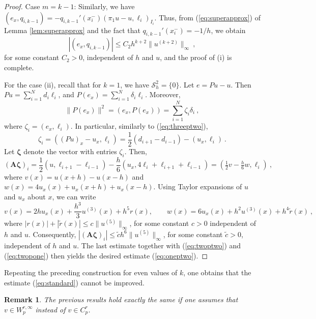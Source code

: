 \documentclass{amsart}
\newcommand{\bA}{\mathbf{A}}
\newcommand{\bB}{\mathbf{B}}
\newcommand{\bzeta}{\boldsymbol{\zeta}}
\newtheorem{remark}{Remark}[section]
\begin{document}
\begin{proof}
Case $m=k-1$: Similarly, we have 
$(e_x,q_{i,k-1})=-q_{i,k-1}'(x_i^-)(\pi_1 u-u,\ell_i)_{I_i}$.
Thus, from (\ref{eq:superapprox}) of Lemma \ref{lem:superapprox} and the fact that $q_{i,k-1}'(x_{i}^-)=-1/h$, we obtain
$$|(e_x,q_{i,k-1})|\leq C_2 h^{k+2}\|u^{(k+2)}\|_\infty\ ,$$
for some constant $C_2>0$, independent of $h$ and $u$, and the proof of (i) is complete.
%

For the case (ii), recall that for $k=1$, we have $\mathcal{S}_h^2=\{0\}$. Let $e=Pu-u$. Then $Pu=\sum_{i=1}^N d_i\ell_i$, and $P(e_x)=\sum_{i=1}^N\delta_i\ell_i$. Moreover,
$$\|P(e_x)\|^2=(e_x,P(e_x))=\sum_{i=1}^N \zeta_i\delta_i\ ,$$
where $\zeta_i=(e_x,\ell_i)$. In particular, similarly to (\ref{eq:threeptwo}), 
$$\zeta_i=((Pu)_x-u_x,\ell_i)=\frac{1}{2}(d_{i+1}-d_{i-1})-(u_x,\ell_i)\ .$$
Let $\bzeta$ denote the vector with entries $\zeta_i$. Then,
$$(\bA\bzeta)_i=\frac{1}{2}(u,\ell_{i+1}-\ell_{i-1})-\frac{h}{6}(u_x,4\ell_i+\ell_{i+1}+\ell_{i-1})=(\tfrac{1}{2}v-\tfrac{h}{6}w,\ell_i)\ ,$$
where $v(x)=u(x+h)-u(x-h)$ and $w(x)=4u_x(x)+u_x(x+h)+u_x(x-h)$. 
%
Using Taylor expansions of $u$ and $u_x$ about $x$, we can write
$$
v(x) =2hu_x(x)+\frac{h^3}{3}u^{(3)}(x)+h^5 r(x),\qquad 
w(x) = 6 u_x(x)+h^2 u^{(3)}(x)+h^4 \widetilde{r}(x)\ ,$$
where $|r(x)|+|\widetilde{r}(x)|\leq c\|u^{(5)}\|_\infty$, for some constant $c>0$ independent of $h$ and $u$. 
%
Consequently, $|(\bA\bzeta)_i|\leq \tilde{c} h^6\|u^{(5)}\|_\infty$,
for some constant $\tilde{c}>0$, independent of $h$ and $u$. The last estimate together with (\ref{eq:twoptwo}) and (\ref{eq:twopone}) then yields the desired estimate (\ref{eq:oneptwo}).
\end{proof}
%
Repeating the preceding construction for even values of $k$, one obtains that the estimate (\ref{eq:standard}) cannot be improved.
%
%
\begin{remark}
The previous results hold exactly the same if one assumes that $v\in W_p^{r,\infty}$ instead of $v\in C_p^{r}$.
\end{remark}
\end{document}
